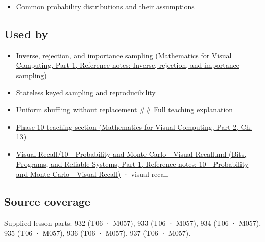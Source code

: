 \begin{itemize}
\tightlist
\item
  \hyperref[appendix-a2360b435383]{Common probability distributions and their assumptions}
\end{itemize}

\subsection{Used by}\label{appendix-e0f7c7e08f3a-used-by}

\hypertarget{appendix-e0f7c7e08f3a-used-by}{}

\begin{itemize}
\item
  \href{../02-Mathematics-for-Visual-Computing-P01/main.pdf\#nameddest=appendix-8d863ed954d0}{Inverse, rejection, and importance sampling (Mathematics for Visual Computing, Part 1, Reference notes: Inverse, rejection, and importance sampling)}
\item
  \hyperref[appendix-daaf25bfd3a0]{Stateless keyed sampling and reproducibility}
\item
  \hyperref[appendix-184fcc411663]{Uniform shuffling without replacement} \#\# Full teaching explanation
\item
  \href{../02-Mathematics-for-Visual-Computing-P02/main.pdf\#nameddest=02-foundations-ii-ch029-a-computer-produces-deterministic-pseudorandom-sequences}{Phase 10 teaching section (Mathematics for Visual Computing, Part 2, Ch. 13)}
\item
  \href{../01-Bits-Programs-and-Reliable-Systems-P01/main.pdf\#nameddest=appendix-cb5af353ef77}{Visual Recall/10 - Probability and Monte Carlo - Visual Recall.md (Bits, Programs, and Reliable Systems, Part 1, Reference notes: 10 - Probability and Monte Carlo - Visual Recall)} · visual recall
\end{itemize}

\subsection{Source coverage}\label{appendix-e0f7c7e08f3a-source-coverage}

\hypertarget{appendix-e0f7c7e08f3a-source-coverage}{}

Supplied lesson parts: 932 (T06 · M057), 933 (T06 · M057), 934 (T06 · M057), 935 (T06 · M057), 936 (T06 · M057), 937 (T06 · M057).
